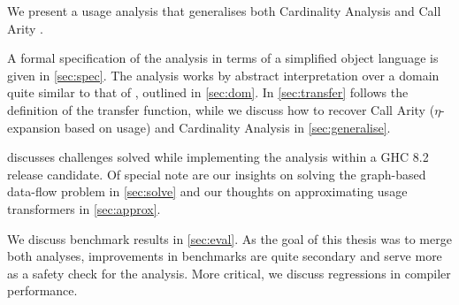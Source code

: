 We present a usage analysis that generalises both Cardinality Analysis \parencite{card} and Call Arity \parencite{callarity}.


A formal specification of the analysis in terms of a simplified object language is given in \cref{sec:spec}.
The analysis works by abstract interpretation over a domain quite similar to that of \textcite{card}, outlined in \cref{sec:dom}.
In \cref{sec:transfer} follows the definition of the transfer function, while we discuss how to recover Call Arity (\eg $\eta$-expansion based on usage) and Cardinality Analysis in \cref{sec:generalise}.

 discusses challenges solved while implementing the analysis within a GHC 8.2 release candidate.
Of special note are our insights on solving the graph-based data-flow problem in \cref{sec:solve} and our thoughts on approximating usage transformers in \cref{sec:approx}.

We discuss benchmark results in \cref{sec:eval}.
As the goal of this thesis was to merge both analyses, improvements in benchmarks are quite secondary and serve more as a safety check for the analysis.
More critical, we discuss regressions in compiler performance.

